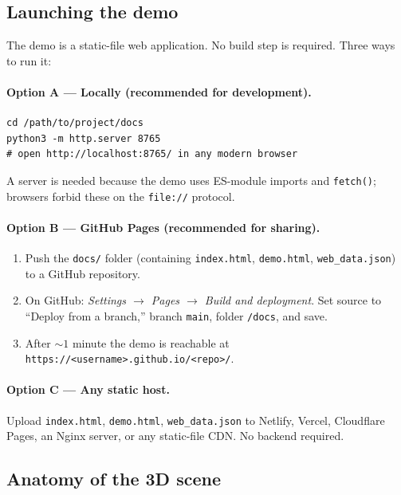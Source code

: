 \documentclass[11pt,a4paper]{article}
\begin{document}
\subsection{Launching the demo}\label{sec:demo:launch}

The demo is a static-file web application. No build step is required. Three ways to run it:

\paragraph{Option A --- Locally (recommended for development).}
\begin{verbatim}
cd /path/to/project/docs
python3 -m http.server 8765
# open http://localhost:8765/ in any modern browser
\end{verbatim}
A server is needed because the demo uses ES-module imports and \texttt{fetch()}; browsers forbid these on the \texttt{file://} protocol.

\paragraph{Option B --- GitHub Pages (recommended for sharing).}
\begin{enumerate}[leftmargin=*]
  \item Push the \texttt{docs/} folder (containing \texttt{index.html}, \texttt{demo.html}, \texttt{web\_data.json}) to a GitHub repository.
  \item On GitHub: \emph{Settings $\to$ Pages $\to$ Build and deployment}. Set source to ``Deploy from a branch,'' branch \texttt{main}, folder \texttt{/docs}, and save.
  \item After $\sim 1$ minute the demo is reachable at \verb|https://<username>.github.io/<repo>/|.
\end{enumerate}

\paragraph{Option C --- Any static host.}
Upload \texttt{index.html}, \texttt{demo.html}, \texttt{web\_data.json} to Netlify, Vercel, Cloudflare Pages, an Nginx server, or any static-file CDN. No backend required.

\subsection{Anatomy of the 3D scene}\label{sec:demo:scene}
\end{document}
